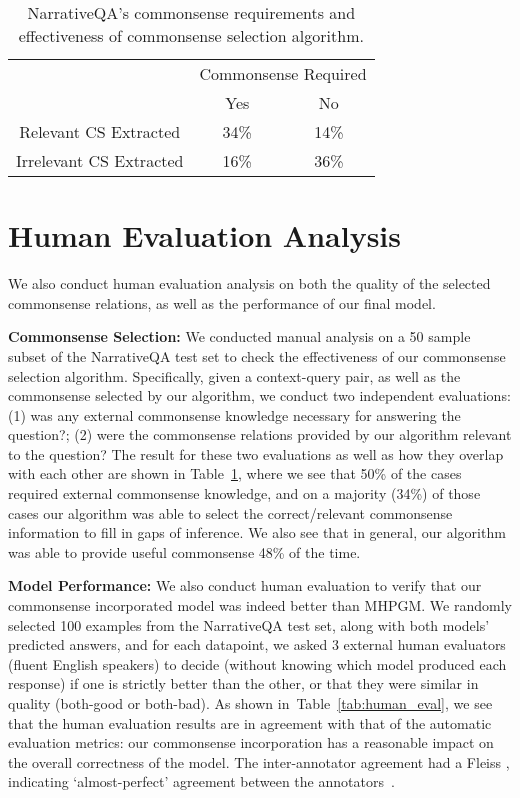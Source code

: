 \documentclass[11pt,a4paper]{article}
\def\tabref#1{Table~\ref{#1}}
\newcommand{\baselineAbbv}{MHPGM}
\begin{document}
  \begin{table}[t]
    \centering
    \begin{small}
    \begin{tabular}{ccc}
    \toprule
    & \multicolumn{2}{c}{Commonsense Required} \\
    & Yes & No \\\midrule
	Relevant CS Extracted& 34\% & 14\%\\
    Irrelevant CS Extracted & 16\%  & 36\% \\
    \bottomrule
    \end{tabular}
    \end{small}
    \vspace{-5pt}
    \caption{NarrativeQA's commonsense requirements and effectiveness of commonsense selection algorithm.}
    \label{tab:commonsense_an}
\end{table} \section{Human Evaluation Analysis}
\label{sec:discussion}
We also conduct human evaluation analysis on both the quality of the selected commonsense relations, as well as the performance of our final model.

\noindent\textbf{Commonsense Selection:} We conducted manual analysis on a 50 sample subset of the NarrativeQA test set to check the effectiveness of our commonsense selection algorithm.
Specifically, given a context-query pair, as well as the commonsense selected by our algorithm, we conduct two independent evaluations: (1) was any external commonsense knowledge necessary for answering the question?; (2) were the commonsense relations provided by our algorithm relevant to the question? 
The result for these two evaluations as well as how they overlap with each other are shown in \tabref{tab:commonsense_an}, where we see that 50\% of the cases required external commonsense knowledge, and on a majority (34\%) of those cases our algorithm was able to select the correct/relevant commonsense information to fill in gaps of inference.
We also see that in general, our algorithm was able to provide useful commonsense 48\% of the time.

\noindent\textbf{Model Performance:}
We also conduct human evaluation to verify that our commonsense incorporated model was indeed better than \baselineAbbv.
We randomly selected 100 examples from the NarrativeQA test set,
along with both models' predicted answers, and for each datapoint, we
asked 3 external human evaluators (fluent English speakers) to decide (without knowing
which model produced each response) if one is strictly better than the other, or
that they were similar in quality (both-good or both-bad).
As shown in~\tabref{tab:human_eval}, we see that the human evaluation
results are in agreement with that of the automatic evaluation metrics: our
commonsense incorporation has a reasonable impact on the overall
correctness of the model. The inter-annotator agreement had a Fleiss
, indicating `almost-perfect' agreement between the
annotators~\cite{landis1977measurement}.
\end{document}
